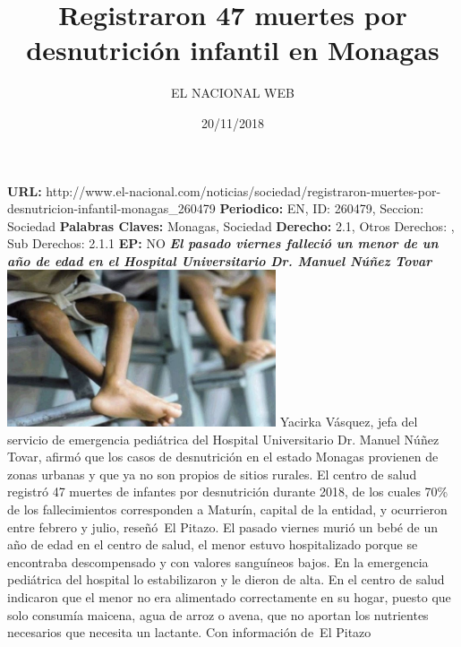 \documentclass{article}%
\title{\textbf{Registraron 47 muertes por desnutrición infantil en Monagas}}%
\author{EL NACIONAL WEB}%
\date{20/11/2018}%
\begin{document}
%
\normalsize%
\maketitle%
\textbf{URL: }%
http://www.el{-}nacional.com/noticias/sociedad/registraron{-}muertes{-}por{-}desnutricion{-}infantil{-}monagas\_260479\newline%
%
\textbf{Periodico: }%
EN, %
ID: %
260479, %
Seccion: %
Sociedad\newline%
%
\textbf{Palabras Claves: }%
Monagas, Sociedad\newline%
%
\textbf{Derecho: }%
2.1, %
Otros Derechos: %
, %
Sub Derechos: %
2.1.1\newline%
%
\textbf{EP: }%
NO\newline%
\newline%
%
\textbf{\textit{El pasado viernes falleció un menor de un año de edad en el Hospital Universitario Dr. Manuel Núñez Tovar}}%
\newline%
\newline%
%
\includegraphics[width=300px]{192.jpg}%
\newline%
%
Yacirka Vásquez, jefa del servicio de emergencia pediátrica del Hospital Universitario Dr. Manuel Núñez Tovar, afirmó que los casos de desnutrición en el estado Monagas provienen de zonas urbanas y que ya no son propios de sitios rurales.%
\newline%
%
El centro de salud registró 47 muertes de infantes por desnutrición durante 2018, de los cuales 70\% de los fallecimientos corresponden a Maturín, capital de la entidad, y ocurrieron entre febrero y julio, reseñó~El Pitazo.%
\newline%
%
El pasado viernes murió un bebé de un año de edad en el centro de salud, el menor estuvo hospitalizado porque se encontraba descompensado y con valores sanguíneos bajos. En la emergencia pediátrica del hospital lo estabilizaron y le dieron de alta.%
\newline%
%
En el centro de salud indicaron que el menor no era alimentado correctamente en su hogar, puesto que solo consumía maicena, agua de arroz o avena, que no aportan los nutrientes necesarios que necesita un lactante.%
\newline%
%
Con información de~El Pitazo%
\newline%
%
\end{document}
